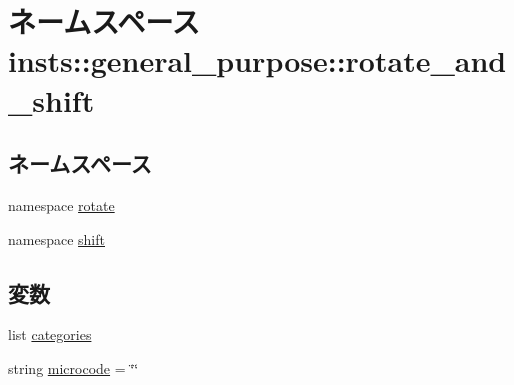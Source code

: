 \hypertarget{namespaceinsts_1_1general__purpose_1_1rotate__and__shift}{
\section{ネームスペース insts::general\_\-purpose::rotate\_\-and\_\-shift}
\label{namespaceinsts_1_1general__purpose_1_1rotate__and__shift}
}
\subsection*{ネームスペース}
\begin{DoxyCompactItemize}
\item 
namespace \hyperlink{namespaceinsts_1_1general__purpose_1_1rotate__and__shift_1_1rotate}{rotate}
\item 
namespace \hyperlink{namespaceinsts_1_1general__purpose_1_1rotate__and__shift_1_1shift}{shift}
\end{DoxyCompactItemize}
\subsection*{変数}
\begin{DoxyCompactItemize}
\item 
list \hyperlink{namespaceinsts_1_1general__purpose_1_1rotate__and__shift_a273cf0f1630af14c1582f05e53354a55}{categories}
\item 
string \hyperlink{namespaceinsts_1_1general__purpose_1_1rotate__and__shift_a770f11a173e99389a8802f0107ed8f52}{microcode} = \char`\"{}\char`\"{}
\end{DoxyCompactItemize}


